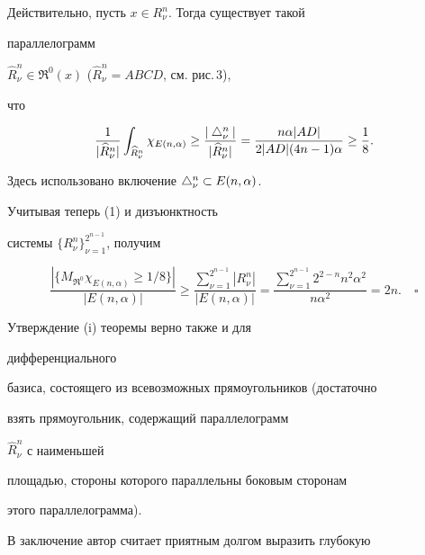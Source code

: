  


Действительно, пусть $x\in R^n_\nu$. Тогда существует такой 


параллелограмм 


$\widehat R^n_\nu\in\Re^0(x)$ ($\widehat R^n_\nu=ABCD$, см. рис.\,3), 


что 


$$ 


\frac{1}{|\widehat R^n_\nu|}\int_{\widehat R^n_\nu}\chi_{E(n,\alpha)} 


\ge \frac{|\bta^n_\nu|}{|\widehat R^n_\nu|}= 


\frac{n\alpha|AD|}{2|AD|(4n-1)\alpha}\ge \frac{1}{8}. 


$$ 


 


Здесь использовано включение $\bigtriangleup^n_\nu\subset E(n,\alpha)$. 


Учитывая теперь (1) и дизъюнктность 


системы $\{R^n_\nu\}^{2^{n-1}}_{\nu=1}$, получим 


$$ 


\frac{|\{M_{\Re^0}\chi_{E(n,\alpha)}\ge 1/8\}|}{|E(n,\alpha)|} 


\ge\frac{\sum\limits^{2^{n-1}}_{\nu=1}|R^n_\nu|}{|E(n,\alpha)|}= 


\frac{\sum\limits^{2^{n-1}}_{\nu=1}2^{2-n}n^2\alpha^2}{n\alpha^2} 


=2n.\quad\square 


$$ 


 


\begin{notenonum} Утверждение (i) теоремы верно также и для 


дифференциального 


базиса, состоящего из всевозможных прямоугольников (достаточно 


взять прямоугольник, содержащий параллелограмм 


$\widehat R^n_\nu$ с наименьшей 


площадью, стороны которого параллельны боковым сторонам 


этого параллелограмма). 


\end{notenonum} 


 


В заключение автор считает приятным долгом выразить глубокую 


